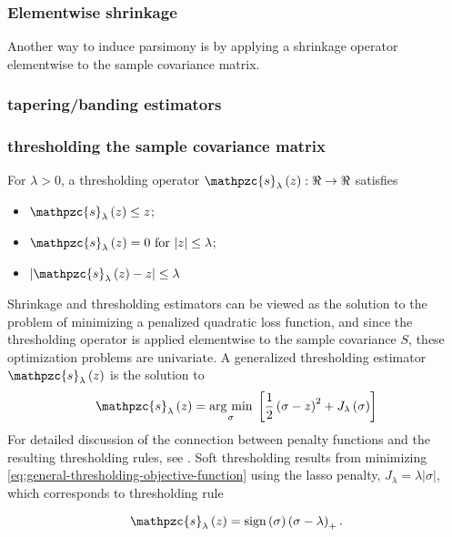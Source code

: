 \documentclass[12pt]{article}
\newcommand{\argmin}[1]{\underset{#1}{\operatorname{arg}\,\operatorname{min}}\;}
\theoremstyle{definition}
\begin{document}
\subsubsection{Elementwise shrinkage} \label{subsubsection:chapter-1-sss-1-3-4}
Another way to induce parsimony is by applying a shrinkage operator elementwise to the sample covariance matrix. 

\subsubsection{tapering/banding estimators}
 

\subsubsection{thresholding the sample covariance matrix}

For $\lambda > 0$, a thresholding operator $\mathpzc{s}_\lambda\left( z \right): \Re \rightarrow \Re$ satisfies 
\begin{itemize}
\item $\mathpzc{s}_\lambda\left( z \right) \le z$;
\item $\mathpzc{s}_\lambda\left( z \right) = 0 \mbox{ for } \vert z\vert \le \lambda$;
\item $\vert \mathpzc{s}_\lambda\left( z \right) - z \vert \le \lambda$
\end{itemize}

Shrinkage and thresholding estimators can be viewed as the solution to the problem of minimizing a penalized quadratic loss function, and since the thresholding operator is applied elementwise to the sample covariance $S$,  these optimization problems are univariate. A generalized thresholding estimator $\mathpzc{s}_\lambda\left( z \right)$ is the solution to
\begin{equation} \label{eq:general-thresholding-objective-function}
\mathpzc{s}_\lambda\left( z \right)  = \argmin{\sigma} \left[ \frac{1}{2} \left(\sigma - z\right)^2 + J_\lambda\left(\sigma \right)\right]
\end{equation}
\noindent
For detailed discussion of the connection between penalty functions and the resulting thresholding rules, see \citet{antoniadis2001regularization}. Soft thresholding results from minimizing \ref{eq:general-thresholding-objective-function} using the lasso penalty, $J_\lambda = \lambda \vert \sigma \vert$, which corresponds to thresholding rule

\begin{equation} 
\mathpzc{s}_\lambda\left( z \right) = \textup{sign}\left(\sigma\right) \left(\sigma  - \lambda\right)_+.
\end{equation}
\end{document}
